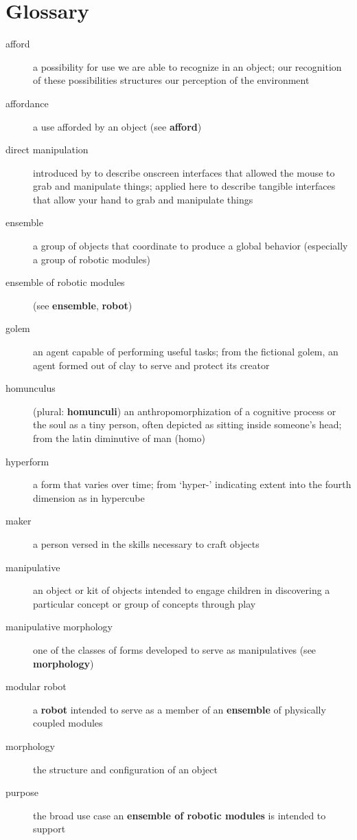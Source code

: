 \chapter{Glossary}
%
\begin{description}
%
\item[afford] a possibility for use we are able to recognize in an object; our recognition of these possibilities structures our perception of the environment \citep{gibson_1979}
%
\item[affordance] a use afforded by an object (see {\bf afford})
%
\item[direct manipulation] introduced by \citet{shneiderman_computer1983} to describe onscreen interfaces that allowed the mouse to grab and manipulate things; applied here to describe tangible interfaces that allow your hand to grab and manipulate things
%
\item[ensemble] a group of objects that coordinate to produce a global behavior (especially a group of robotic modules)
%
\item[ensemble of robotic modules] (see {\bf ensemble}, {\bf robot})
%
\item[golem] an agent capable of performing useful tasks; from the fictional golem, an agent formed out of clay to serve and protect its creator
%
\item[homunculus] (plural: {\bf homunculi}) an anthropomorphization of a cognitive process or the soul as a tiny person, often depicted as sitting inside someone's head; from the latin diminutive of man (homo)
%
\item[hyperform] a form that varies over time; from `hyper-' indicating extent into the fourth dimension as in hypercube
%
\item[maker] a person versed in the skills necessary to craft objects
%
\item[manipulative] an object or kit of objects intended to engage children in discovering a particular concept or group of concepts through play
%
\item[manipulative morphology] one of the classes of forms developed to serve as manipulatives (see {\bf morphology})
%
\item[modular robot] a {\bf robot} intended to serve as a member of an {\bf ensemble} of physically coupled modules
%
\item[morphology] the structure and configuration of an object
%
\item[purpose] the broad use case an {\bf ensemble of robotic modules} is intended to support

\end{description}
